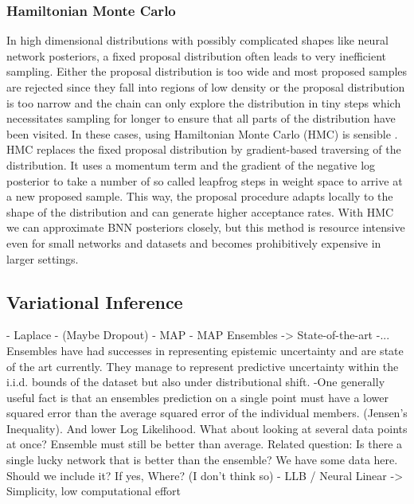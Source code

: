 \documentclass[../thesis.tex]{subfiles}
\begin{document}
\subsubsection{Hamiltonian Monte Carlo}
In high dimensional distributions with possibly complicated shapes like neural network posteriors, a fixed proposal distribution often leads to very inefficient sampling. Either the proposal distribution is too wide and most proposed samples are rejected since they fall into regions of low density or the proposal distribution is too narrow and the chain can only explore the distribution in tiny steps which necessitates sampling for longer to ensure that all parts of the distribution have been visited. In these cases, using Hamiltonian Monte Carlo (HMC) is sensible \parencite{duane1987hybrid, neal1995bayesian}. HMC replaces the fixed proposal distribution by gradient-based traversing of the distribution. It uses a momentum term and the gradient of the negative log posterior to take a number of so called leapfrog steps in weight space to arrive at a new proposed sample. This way, the proposal procedure adapts locally to the shape of the distribution and can generate higher acceptance rates. With HMC we can approximate BNN posteriors closely, but this method is resource intensive even for small networks and datasets and becomes prohibitively expensive in larger settings.

\subsection{Variational Inference}

- Laplace
- (Maybe Dropout)
- MAP
- MAP Ensembles -> State-of-the-art
    -... Ensembles have had successes in representing epistemic uncertainty and are state of the art currently. They manage to represent predictive uncertainty within the i.i.d. bounds of the dataset but also under distributional shift.
    -One generally useful fact is that an ensembles prediction on a single point must have a lower squared error than the average squared error of the individual members. (Jensen's Inequality). And lower Log Likelihood.
    What about looking at several data points at once? Ensemble must still be better than average.
    Related question: Is there a single lucky network that is better than the ensemble? 
    We have some data here. Should we include it? If yes, Where? (I don't think so)
- LLB / Neural Linear -> Simplicity, low computational effort
\end{document}
